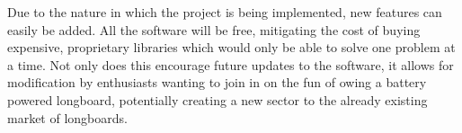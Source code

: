 Due to the nature in which the project is being implemented, new features can easily be added. All the software will be free, mitigating the cost of buying expensive, proprietary libraries which would only be able to solve one problem at a time. Not only does this encourage future updates to the software, it allows for modification by enthusiasts wanting to join in on the fun of owing a battery powered longboard, potentially creating a new sector to the already existing market of longboards.
